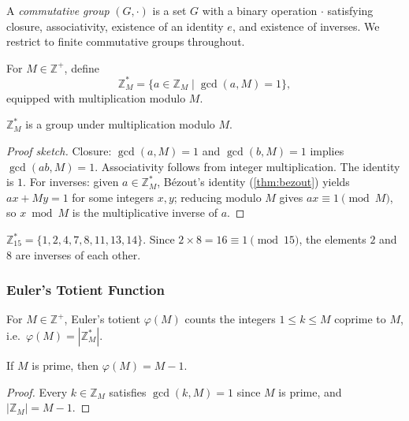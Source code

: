 \begin{definition}
A \emph{commutative group} $(G, \cdot)$ is a set $G$ with a binary operation $\cdot$ satisfying closure, associativity, existence of an identity $e$, and existence of inverses. We restrict to finite commutative groups throughout.
\end{definition}

\begin{definition}
For $M \in \mathbb{Z}^+$, define
\[
    \mathbb{Z}_M^* = \{a \in \mathbb{Z}_M \mid \gcd(a,M)=1\},
\]
equipped with multiplication modulo $M$.
\end{definition}

\begin{lemma}
$\mathbb{Z}_M^*$ is a group under multiplication modulo $M$.
\end{lemma}
\begin{proof}[Proof sketch]
Closure: $\gcd(a,M)=1$ and $\gcd(b,M)=1$ implies $\gcd(ab,M)=1$. Associativity follows from integer multiplication. The identity is $1$. For inverses: given $a \in \mathbb{Z}_M^*$, Bézout's identity (\cref{thm:bezout}) yields $ax + My = 1$ for some integers $x,y$; reducing modulo $M$ gives $ax \equiv 1 \pmod{M}$, so $x \bmod M$ is the multiplicative inverse of $a$.
\end{proof}

\begin{example}
$\mathbb{Z}_{15}^* = \{1,2,4,7,8,11,13,14\}$. Since $2 \times 8 = 16 \equiv 1 \pmod{15}$, the elements $2$ and $8$ are inverses of each other.
\end{example}

\subsubsection{Euler's Totient Function}

\begin{definition}
For $M \in \mathbb{Z}^+$, Euler's totient $\varphi(M)$ counts the integers $1 \leq k \leq M$ coprime to $M$, i.e.\ $\varphi(M) = |\mathbb{Z}_M^*|$.
\end{definition}

\begin{theorem}
\label{thm:totient-prime}
If $M$ is prime, then $\varphi(M) = M-1$.
\end{theorem}
\begin{proof}
Every $k \in \mathbb{Z}_M$ satisfies $\gcd(k,M)=1$ since $M$ is prime, and $|\mathbb{Z}_M|=M-1$.
\end{proof}

